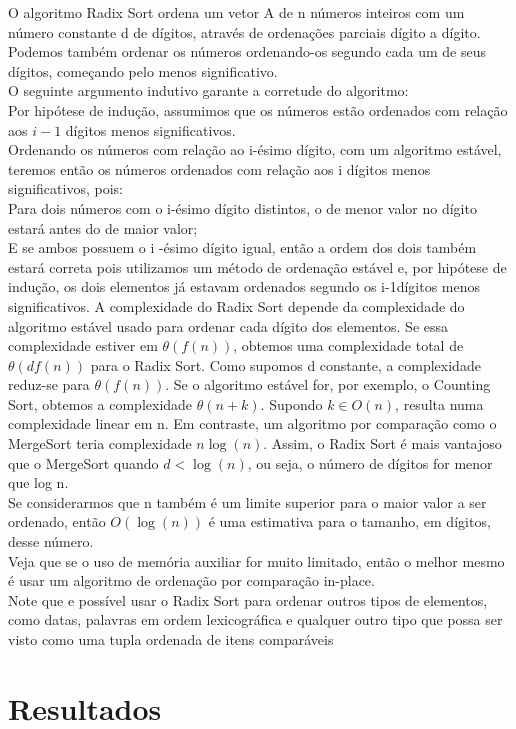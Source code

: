 \documentclass[12pt,a4paper,twoside]{report}
\begin{document}
O algoritmo Radix Sort ordena um vetor A de n números inteiros
com um número constante d de dígitos, através de ordenações
parciais dígito a dígito.\\
Podemos também ordenar os números ordenando-os segundo
cada um de seus dígitos, começando pelo menos significativo.\\
O seguinte argumento indutivo garante a corretude do algoritmo:\\
Por hipótese de indução, assumimos que os números estão
ordenados com relação aos $i - 1$ dígitos menos
significativos.\\
Ordenando os números com relação ao i-ésimo dígito, com um
algoritmo estável, teremos então os números ordenados com
relação aos i dígitos menos significativos, pois:
\\Para dois números com o i-ésimo dígito distintos, o de menor valor
no dígito estará antes do de maior valor;
\\E se ambos possuem o i -ésimo dígito igual, então a ordem dos
dois também estará correta pois utilizamos um método de
ordenação estável e, por hipótese de indução, os dois elementos já
estavam ordenados segundo os i-1dígitos menos significativos.
A complexidade do Radix Sort depende da complexidade
do algoritmo estável usado para ordenar cada dígito dos
elementos.
Se essa complexidade estiver em $\theta(f(n))$, obtemos uma
complexidade total de $\theta(d f(n))$ para o Radix Sort.
Como supomos d constante, a complexidade reduz-se para
$\theta(f(n))$.
Se o algoritmo estável for, por exemplo, o Counting Sort,
obtemos a complexidade $\theta(n + k)$.
Supondo $k ∈ O(n)$, resulta numa complexidade linear em n.
Em contraste, um algoritmo por comparação como o
MergeSort teria complexidade $n \log(n)$.
Assim, o Radix Sort é mais vantajoso que o MergeSort
quando $d < \log(n)$, ou seja, o número de dígitos for menor
que log n.\\
Se considerarmos que n também é um limite superior para
o maior valor a ser ordenado, então $O(\log (n))$ é uma
estimativa para o tamanho, em dígitos, desse número.
\\
Veja que se o uso de memória auxiliar for muito limitado,
então o melhor mesmo é usar um algoritmo de ordenação
por comparação in-place.\\
Note que e possível usar o Radix Sort para ordenar outros
tipos de elementos, como datas, palavras em ordem
lexicográfica e qualquer outro tipo que possa ser visto como
uma tupla ordenada de itens comparáveis

\chapter{Resultados}
\end{document}
